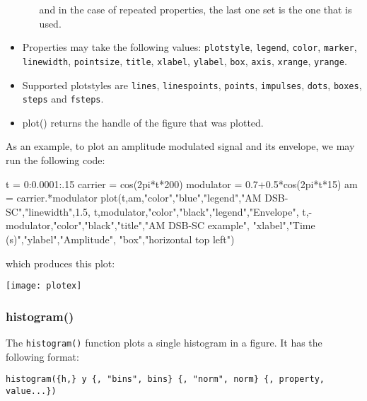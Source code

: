 \documentclass[11pt]{article}
\newcommand{\cmd}[1]{\texttt{#1}}
\begin{document}
\begin{itemize}
\begin{itemize}
				and in the case of repeated properties, the last one set is the
				one that is used.
		\end{itemize}
	\item Properties may take the following values: \cmd{plotstyle},
		\cmd{legend}, \cmd{color},
		\cmd{marker}, \cmd{linewidth}, \cmd{pointsize}, \cmd{title},
		\cmd{xlabel}, \cmd{ylabel}, \cmd{box}, \cmd{axis},
		\cmd{xrange}, \cmd{yrange}.
	\item Supported plotstyles are \cmd{lines}, \cmd{linespoints},
		\cmd{points}, \cmd{impulses}, \cmd{dots}, \cmd{boxes}, \cmd{steps} and
		\cmd{fsteps}.
	\item plot() returns the handle of the figure that was plotted.
\end{itemize}

As an example, to plot an amplitude modulated signal and its envelope, we may
run the following code:

\begin{juliacode}
t = 0:0.0001:.15
carrier = cos(2pi*t*200)
modulator = 0.7+0.5*cos(2pi*t*15)
am = carrier.*modulator
plot(t,am,"color","blue","legend","AM DSB-SC","linewidth",1.5,
    t,modulator,"color","black","legend","Envelope",
    t,-modulator,"color","black","title","AM DSB-SC example",
    "xlabel","Time (s)","ylabel","Amplitude",
    "box","horizontal top left")
\end{juliacode}

\noindent which produces this plot:

\begin{center}
\texttt{[image: plotex]}
\end{center}

\subsubsection{histogram()}

The \cmd{histogram()} function plots a single histogram in a figure. It has the
following format:

\cmd{histogram(\{h,\} y \{, "bins", bins\} \{, "norm", norm\}
\{, property, value...\})}
\end{document}
